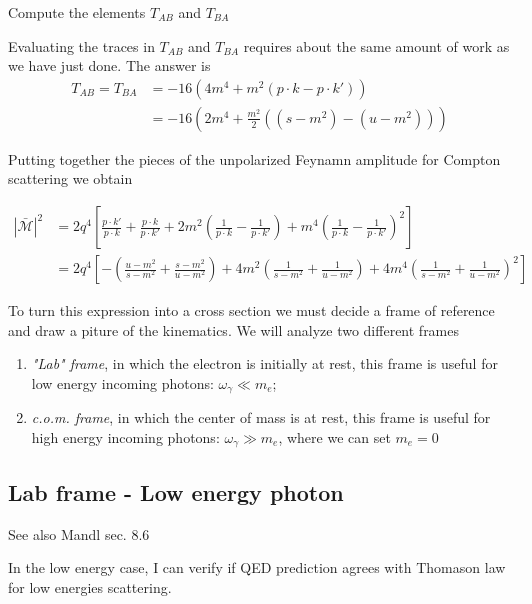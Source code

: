 \documentclass[TheoreticalPhy_ModB.tex]{subfiles}
\begin{document}
\begin{example}
Compute the elements $T_{AB}$ and $T_{BA}$
\end{example}

Evaluating the traces in $T_{AB}$ and $T_{BA}$ requires about the same amount of work as we have just done. The answer is 
\begin{align*}
T_{AB}=T_{BA}&=-16\left(4m^4+m^2(p\cdot k-p\cdot k')\right)\\
&=-16\left(2m^4+\frac{m^2}2((s-m^2)-(u-m^2))\right)
\end{align*}

Putting together the pieces of the unpolarized Feynamn amplitude for Compton scattering we obtain

\begin{equation}\label{eqn:Compton-unpolarized-squared}\begin{split}
|\bar{\mathcal M}|^2&=2q^4\left[\frac{p\cdot k'}{p\cdot k}+\frac{p\cdot k}{p\cdot k'}+2m^2\left(\frac1{p\cdot k}-\frac1{p\cdot k'}\right)+m^4\left(\frac1{p\cdot k}-\frac1{p\cdot k'}\right)^2\right]\\
&=2q^4\left[-\left(\frac{u-m^2}{s-m^2}+\frac{s-m^2}{u-m^2}\right)+4m^2\left(\frac1{s-m^2}+\frac1{u-m^2}\right)+4m^4\left(\frac1{s-m^2}+\frac1{u-m^2}\right)^2\right]
\end{split}\end{equation}

To turn this expression into a cross section we must decide a frame of reference and draw a piture of the kinematics. We will analyze two different frames
\begin{enumerate}
\item \emph{"Lab" frame}, in which the electron is initially at rest, this frame is useful for low energy incoming photons: $\omega_\gamma\ll m_e$;
\item \emph{c.o.m. frame}, in which the center of mass is at rest, this frame is useful for high energy incoming photons: $\omega_\gamma\gg m_e$, where we can set $m_e=0$
\end{enumerate}

\subsection{Lab frame - Low energy photon}
\textsf{See also Mandl sec. 8.6}

In the low energy case, I can verify if QED prediction agrees with Thomason law for low energies scattering.
\end{document}
